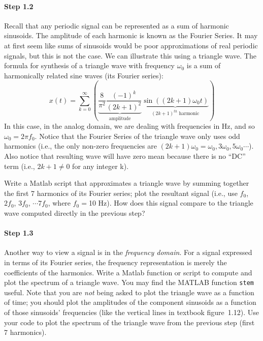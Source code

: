 \paragraph{Step 1.2} Recall that any periodic signal can be
represented as a sum of harmonic sinusoids.  The amplitude of each
harmonic is known as the Fourier Series. It may at first seem like
sums of sinusoids would be poor approximations of real periodic
signals, but this is not the case. We can illustrate this using a
triangle wave. The formula for synthesis of a triangle wave with
frequency $\omega_0$ is a sum of harmonically related sine waves (its
Fourier series):
  \[
  x(t) = \sum_{k=0}^{\infty}
  \left( 
    \underbrace{ \frac{8}{\pi^2} \frac{(-1)^k}{(2k+ 1)^2} }_{ \text{amplitude} } 
    \underbrace{ \sin((2k+1)\omega_0 t) }_{ (2k+1)^{th}\text{ harmonic} } 
  \right)
  \]
  In this case, in the analog domain, we are dealing with frequencies
  in Hz, and so $\omega_0 = 2\pi f_0$. Notice that the Fourier Series
  of the triangle wave only uses odd harmonics (i.e., the only
  non-zero frequencies are $(2k+1)\omega_0=\omega_0, 3\omega_0,
  5\omega_0 \cdots$). Also notice that resulting wave will have zero
  mean because there is no ``DC'' term (i.e., $2k+1 \neq 0$ for any
  integer k).

  Write a Matlab script that approximates a triangle wave by summing
  together the first 7 harmonics of its Fourier series; plot the
  resultant signal (i.e., use $f_0$, $2f_0$, $3f_0$, $\cdots 7f_0$,
  where $f_0=$10 Hz). How does this signal compare to the triangle
  wave computed directly in the previous step?



\paragraph{Step 1.3} Another way to view a signal is in the
\emph{frequency domain}. For a signal expressed in terms of its
Fourier series, the frequency representation is merely the
coefficients of the harmonics. Write a Matlab function or script to
compute and plot the spectrum of a triangle wave. You may find the
MATLAB function \texttt{stem} useful.  Note that you are \emph{not}
being asked to plot the triangle wave as a function of time; you
should plot the amplitudes of the component sinusoids as a function of
those sinusoids' frequencies (like the vertical lines in textbook
figure~1.12).  Use your code to plot the spectrum of the triangle wave
from the previous step (first 7 harmonics).

